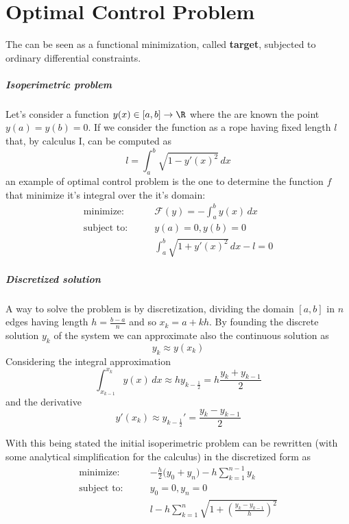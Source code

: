 \chapter{Optimal Control Problem}

The  can be seen as a functional minimization, called \textbf{target}, subjected to ordinary differential constraints.

\paragraph{Isoperimetric problem} Let's consider a function $y (x) \in [a,b]\rightarrow \R$ where the are known the point $y(a) = y(b) = 0$. If we consider the function as a rope having fixed length $l$ that, by calculus I, can be computed as
\[ l = \int_a^b \sqrt{1- y'(x)^2}\, dx \]
an example of optimal control problem is the one to determine the function $f$ that minimize it's integral over the it's domain:
\begin{align*}
	\textrm{minimize:} \qquad & \mathcal F(y) = - \int_a^b y(x)\, dx \\
	\textrm{subject to:} \qquad & y(a) = 0 , y(b) = 0\\ & \int_a^b \sqrt{1+y'(x)^2}\, dx - l = 0
\end{align*}

\paragraph{Discretized solution} A way to solve the problem is by discretization, dividing the domain $[a,b]$ in $n$ edges having length $h= \frac{b-a}{n}$ and so $x_k = a + k h$. By founding the discrete solution $y_k$ of the system we can approximate also the continuous solution as
\[ y_k \approx y(x_k) \]
Considering the integral approximation
\[ \int_{x_{k-1}}^{x_k} y(x)\, dx \approx h y_{k-\frac 1 2} = h \frac{y_{k} + y_{k-1}}{2} \]
and the derivative
\[ y'(x_k) \approx y_{k-\frac 1 2}' = \frac{y_k - y_{k-1}}{2} \]

With this being stated the initial isoperimetric problem can be rewritten (with some analytical simplification for the calculus) in the discretized form as	
\begin{align*}
	\textrm{minimize:} \qquad & - \frac  h 2\big(y_0+y_n\big) - h \sum_{k=1}^{n-1} y_k \\
	\textrm{subject to:} \qquad & y_0 = 0 , y_n= 0\\ & l - h \sum_{k=1}^{n} \sqrt{1 + \left( \frac{y_k - y_{k-1}}{h} \right)^2}
\end{align*}

